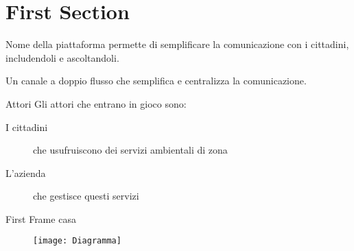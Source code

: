 \section{First Section}
\begin{frame}{}

  Nome della piattaforma permette di semplificare la comunicazione con i cittadini, includendoli e ascoltandoli.
  \pause
  \bigskip

  Un canale a doppio flusso che semplifica e centralizza la comunicazione.


\end{frame}
\begin{frame}{Attori}
  Gli attori che entrano in gioco sono:
  \begin{description}
    \item[I cittadini] che usufruiscono dei servizi ambientali di zona
    \item[L'azienda] che gestisce questi servizi
  \end{description}


\end{frame}
\begin{frame}{First Frame}
  casa

  \begin{figure}

    \texttt{[image: Diagramma]}
  \end{figure}

\end{frame}
